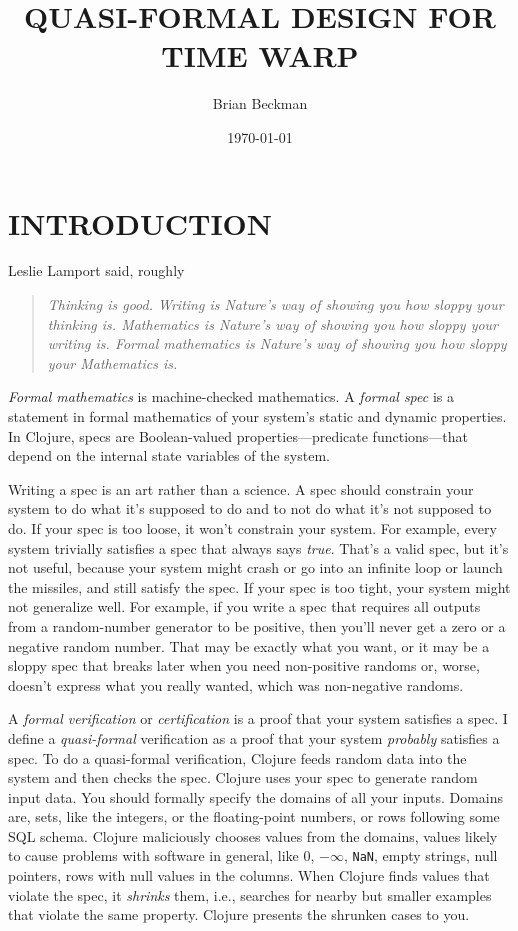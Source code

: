 \documentclass[10pt,oneside,x11names]{article}
\author{Brian Beckman}
\date{\today}
\title{QUASI-FORMAL DESIGN FOR TIME WARP}
\begin{document}
\maketitle
\setcounter{tocdepth}{2}
\tableofcontents


\section{INTRODUCTION}
\label{sec:org9e30a19}

Leslie Lamport said, roughly

\begin{quote}
\emph{Thinking is good. Writing is Nature's way of showing you how sloppy your thinking is. Mathematics is Nature's way of showing you how sloppy your writing is. Formal mathematics is Nature's way of showing you how sloppy your Mathematics is.}
\end{quote}

\emph{Formal mathematics} is machine-checked mathematics. A \emph{formal spec} is a
statement in formal mathematics of your system's static and dynamic properties.
In Clojure, specs are Boolean-valued properties---predicate functions---that
depend on the internal state variables of the system.

Writing a spec is an art rather than a science. A spec should constrain your
system to do what it's supposed to do and to not do what it's not supposed to
do. If your spec is too loose, it won't constrain your system. For example,
every system trivially satisfies a spec that always says \emph{true}. That's a valid
spec, but it's not useful, because your system might crash or go into an
infinite loop or launch the missiles, and still satisfy the spec. If your spec
is too tight, your system might not generalize well. For example, if you write a
spec that requires all outputs from a random-number generator to be positive,
then you'll never get a zero or a negative random number. That may be exactly
what you want, or it may be a sloppy spec that breaks later when you need
non-positive randoms or, worse, doesn't express what you really wanted, which
was non-negative randoms.

A \emph{formal verification} or \emph{certification} is a proof that your system satisfies
a spec. I define a \emph{quasi-formal} verification as a proof that your system
\emph{probably} satisfies a spec. To do a quasi-formal verification, Clojure feeds
random data into the system and then checks the spec. Clojure uses your spec to
generate random input data. You should formally specify the domains of all your
inputs. Domains are, sets, like the integers, or the floating-point numbers, or
rows following some SQL schema. Clojure maliciously chooses values from the
domains, values likely to cause problems with software in general, like \(0\),
\(-\infty\), \texttt{NaN}, empty strings, null pointers, rows with null values in the
columns. When Clojure finds values that violate the spec, it \emph{shrinks} them,
i.e., searches for nearby but smaller examples that violate the same property.
Clojure presents the shrunken cases to you.
\end{document}
